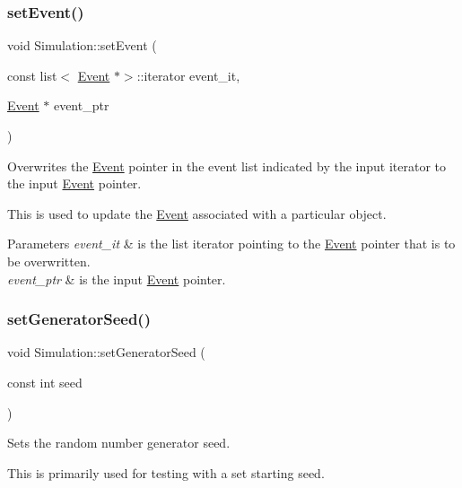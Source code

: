 \subsubsection{\texorpdfstring{set\+Event()}{setEvent()}}
{\footnotesize\ttfamily void Simulation\+::set\+Event (\begin{DoxyParamCaption}\item[{const list$<$ \hyperlink{class_event}{Event} $\ast$$>$\+::iterator}]{event\+\_\+it,  }\item[{\hyperlink{class_event}{Event} $\ast$}]{event\+\_\+ptr }\end{DoxyParamCaption})\hspace{0.3cm}{\ttfamily [protected]}}



Overwrites the \hyperlink{class_event}{Event} pointer in the event list indicated by the input iterator to the input \hyperlink{class_event}{Event} pointer. 

This is used to update the \hyperlink{class_event}{Event} associated with a particular object. 
\begin{DoxyParams}{Parameters}
{\em event\+\_\+it} & is the list iterator pointing to the \hyperlink{class_event}{Event} pointer that is to be overwritten. \\
\hline
{\em event\+\_\+ptr} & is the input \hyperlink{class_event}{Event} pointer. \\
\hline
\end{DoxyParams}
\mbox{\label{class_simulation_a1a825b9da67da43104137662694655bd}} 
\subsubsection{\texorpdfstring{set\+Generator\+Seed()}{setGeneratorSeed()}}
{\footnotesize\ttfamily void Simulation\+::set\+Generator\+Seed (\begin{DoxyParamCaption}\item[{const int}]{seed }\end{DoxyParamCaption})}



Sets the random number generator seed. 

This is primarily used for testing with a set starting seed. \mbox{\label{class_simulation_a1affa7d0725c3d10663095619dcb9208}} 
